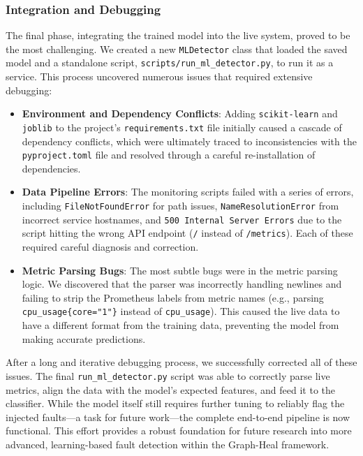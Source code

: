 \documentclass[11pt,conference]{IEEEtran}
\begin{document}
\subsubsection{Integration and Debugging}
The final phase, integrating the trained model into the live system, proved to be the most challenging. We created a new \texttt{MLDetector} class that loaded the saved model and a standalone script, \texttt{scripts/run\_ml\_detector.py}, to run it as a service. This process uncovered numerous issues that required extensive debugging:
\begin{itemize}
    \item \textbf{Environment and Dependency Conflicts}: Adding \texttt{scikit-learn} and \texttt{joblib} to the project's \texttt{requirements.txt} file initially caused a cascade of dependency conflicts, which were ultimately traced to inconsistencies with the \texttt{pyproject.toml} file and resolved through a careful re-installation of dependencies.
    \item \textbf{Data Pipeline Errors}: The monitoring scripts failed with a series of errors, including \texttt{FileNotFoundError} for path issues, \texttt{NameResolutionError} from incorrect service hostnames, and \texttt{500 Internal Server Errors} due to the script hitting the wrong API endpoint (\texttt{/} instead of \texttt{/metrics}). Each of these required careful diagnosis and correction.
    \item \textbf{Metric Parsing Bugs}: The most subtle bugs were in the metric parsing logic. We discovered that the parser was incorrectly handling newlines and failing to strip the Prometheus labels from metric names (e.g., parsing \texttt{cpu\_usage\{core="1"\}} instead of \texttt{cpu\_usage}). This caused the live data to have a different format from the training data, preventing the model from making accurate predictions.
\end{itemize}

After a long and iterative debugging process, we successfully corrected all of these issues. The final \texttt{run\_ml\_detector.py} script was able to correctly parse live metrics, align the data with the model's expected features, and feed it to the classifier. While the model itself still requires further tuning to reliably flag the injected faults—a task for future work—the complete end-to-end pipeline is now functional. This effort provides a robust foundation for future research into more advanced, learning-based fault detection within the Graph-Heal framework.
\end{document}
